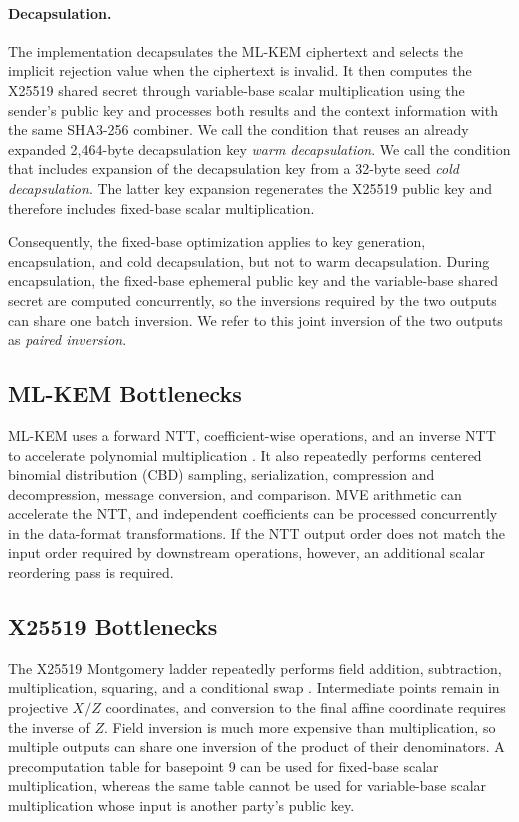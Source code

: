 \documentclass[runningheads,orivec]{llncs}
\begin{document}
\paragraph{Decapsulation.}
The implementation decapsulates the ML-KEM ciphertext and selects the implicit
rejection value when the ciphertext is invalid. It then computes the X25519
shared secret through variable-base scalar multiplication using the sender's
public key and processes both results and the context information with the same
SHA3-256 combiner. We call the condition that reuses an already expanded
2,464-byte decapsulation key \emph{warm decapsulation}. We call the condition
that includes expansion of the decapsulation key from a 32-byte seed
\emph{cold decapsulation}. The latter key expansion regenerates the X25519
public key and therefore includes fixed-base scalar multiplication.

Consequently, the fixed-base optimization applies to key generation,
encapsulation, and cold decapsulation, but not to warm decapsulation. During
encapsulation, the fixed-base ephemeral public key and the variable-base shared
secret are computed concurrently, so the inversions required by the two outputs
can share one batch inversion. We refer to this joint inversion of the two
outputs as \emph{paired inversion}.

\subsection{ML-KEM Bottlenecks}

ML-KEM uses a forward NTT, coefficient-wise operations, and an inverse NTT to
accelerate polynomial multiplication \cite{FIPS203}. It also repeatedly performs
centered binomial distribution (CBD) sampling, serialization, compression and
decompression, message conversion, and comparison. MVE arithmetic can
accelerate the NTT, and independent coefficients can be processed concurrently
in the data-format transformations. If the NTT output order does not match the
input order required by downstream operations, however, an additional scalar
reordering pass is required.

\subsection{X25519 Bottlenecks}

The X25519 Montgomery ladder repeatedly performs field addition, subtraction,
multiplication, squaring, and a conditional swap \cite{RFC7748}. Intermediate
points remain in projective $X/Z$ coordinates, and conversion to the final
affine coordinate requires the inverse of $Z$. Field inversion is much more
expensive than multiplication, so multiple outputs can share one inversion of
the product of their denominators. A precomputation table for basepoint 9 can be
used for fixed-base scalar multiplication, whereas the same table cannot be
used for variable-base scalar multiplication whose input is another party's
public key.
\end{document}
